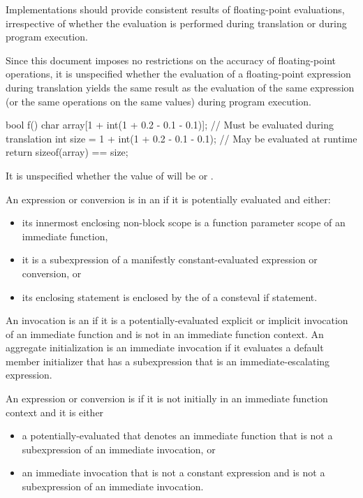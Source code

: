 \pnum
\recommended
Implementations should provide consistent results of floating-point evaluations,
irrespective of whether the evaluation is performed
during translation or during program execution.
\begin{note}
Since this document
imposes no restrictions on the accuracy of floating-point operations, it is unspecified whether the
evaluation of a floating-point expression during translation yields the same result as the
evaluation of the same expression (or the same operations on the same values) during program
execution.
\begin{example}
\begin{codeblock}
bool f() {
    char array[1 + int(1 + 0.2 - 0.1 - 0.1)];   // Must be evaluated during translation
    int size = 1 + int(1 + 0.2 - 0.1 - 0.1);    // May be evaluated at runtime
    return sizeof(array) == size;
}
\end{codeblock}
It is unspecified whether the value of  will be  or .
\end{example}
\end{note}

\pnum
An expression or conversion is in an 
if it is potentially evaluated and either:
\begin{itemize}
\item
its innermost enclosing non-block scope is
a function parameter scope of an immediate function,
\item
it is a subexpression of a manifestly constant-evaluated expression
or conversion, or
\item
its enclosing statement is enclosed by
the  of a consteval if statement.
\end{itemize}
An invocation is an 
if it is a potentially-evaluated explicit or implicit invocation of
an immediate function and
is not in an immediate function context.
An aggregate initialization is an immediate invocation
if it evaluates a default member initializer
that has a subexpression that is an immediate-escalating expression.

\pnum
{}%
%
%
%
An expression or conversion is 
if it is not initially in an immediate function context
and it is either
\begin{itemize}
\item
a potentially-evaluated 
that denotes an immediate function
that is not a subexpression of an immediate invocation, or
\item
an immediate invocation that is not a constant expression
and is not a subexpression of an immediate invocation.
\end{itemize}

